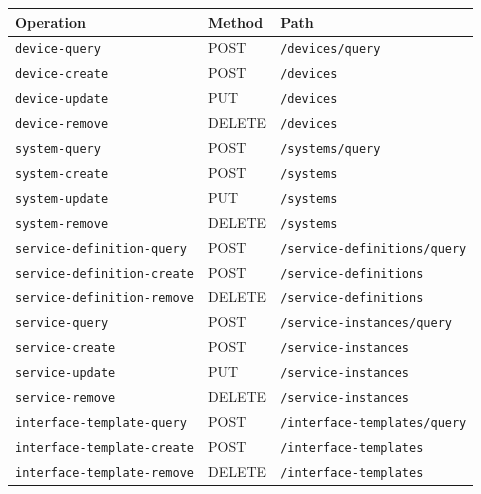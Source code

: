 \documentclass[a4paper]{arrowhead}
\begin{document}
\noindent\begin{longtable}{| p{5.2cm} | p{1.6cm} | p{8.4cm} |} \hline
\rowcolor{gray!33} Operation & Method & Path \\ \hline \endhead
\texttt{device-\allowbreak{}query} & POST & \texttt{/\allowbreak{}devices/\allowbreak{}query} \\ \hline
\texttt{device-\allowbreak{}create} & POST & \texttt{/\allowbreak{}devices} \\ \hline
\texttt{device-\allowbreak{}update} & PUT & \texttt{/\allowbreak{}devices} \\ \hline
\texttt{device-\allowbreak{}remove} & DELETE & \texttt{/\allowbreak{}devices} \\ \hline
\texttt{system-\allowbreak{}query} & POST & \texttt{/\allowbreak{}systems/\allowbreak{}query} \\ \hline
\texttt{system-\allowbreak{}create} & POST & \texttt{/\allowbreak{}systems} \\ \hline
\texttt{system-\allowbreak{}update} & PUT & \texttt{/\allowbreak{}systems} \\ \hline
\texttt{system-\allowbreak{}remove} & DELETE & \texttt{/\allowbreak{}systems} \\ \hline
\texttt{service-\allowbreak{}definition-\allowbreak{}query} & POST & \texttt{/\allowbreak{}service-\allowbreak{}definitions/\allowbreak{}query} \\ \hline
\texttt{service-\allowbreak{}definition-\allowbreak{}create} & POST & \texttt{/\allowbreak{}service-\allowbreak{}definitions} \\ \hline
\texttt{service-\allowbreak{}definition-\allowbreak{}remove} & DELETE & \texttt{/\allowbreak{}service-\allowbreak{}definitions} \\ \hline
\texttt{service-\allowbreak{}query} & POST & \texttt{/\allowbreak{}service-\allowbreak{}instances/\allowbreak{}query} \\ \hline
\texttt{service-\allowbreak{}create} & POST & \texttt{/\allowbreak{}service-\allowbreak{}instances} \\ \hline
\texttt{service-\allowbreak{}update} & PUT & \texttt{/\allowbreak{}service-\allowbreak{}instances} \\ \hline
\texttt{service-\allowbreak{}remove} & DELETE & \texttt{/\allowbreak{}service-\allowbreak{}instances} \\ \hline
\texttt{interface-\allowbreak{}template-\allowbreak{}query} & POST & \texttt{/\allowbreak{}interface-\allowbreak{}templates/\allowbreak{}query} \\ \hline
\texttt{interface-\allowbreak{}template-\allowbreak{}create} & POST & \texttt{/\allowbreak{}interface-\allowbreak{}templates} \\ \hline
\texttt{interface-\allowbreak{}template-\allowbreak{}remove} & DELETE & \texttt{/\allowbreak{}interface-\allowbreak{}templates} \\ \hline
\end{longtable}
\end{document}
